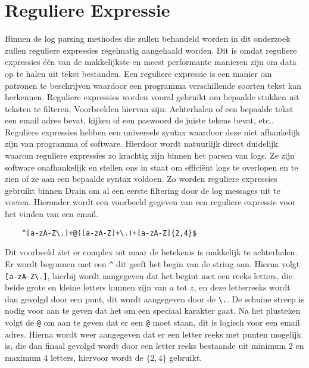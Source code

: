 \section{Reguliere Expressie}
Binnen de log parsing methodes die zullen behandeld worden in dit onderzoek zullen reguliere expressies regelmatig aangehaald worden. Dit is omdat reguliere expressies één van de makkelijkste en meest performante manieren zijn om data op te halen uit tekst bestanden. Een reguliere expressie is een manier om patronen te beschrijven waardoor een programma verschillende soorten tekst kan herkennen. Reguliere expressies worden vooral gebruikt om bepaalde stukken uit teksten te filteren. Voorbeelden hiervan zijn: Achterhalen of een bepaalde tekst een email adres bevat, kijken of een paswoord de juiste tekens bevat, etc.. Reguliere expressies hebben een universele syntax waardoor deze niet afhankelijk zijn van programma of software. Hierdoor wordt natuurlijk direct duidelijk waarom reguliere expressies zo krachtig zijn binnen het parsen van logs. Ze zijn software onafhankelijk en stellen ons in staat om efficiënt logs te overlopen en te zien of ze aan een bepaalde syntax voldoen. Zo worden reguliere expressies gebruikt binnen Drain om al een eerste filtering door de log messages uit te voeren. Hieronder wordt een voorbeeld gegeven van een reguliere expressie voor het vinden van een email.
\begin{verbatim}
    ^[a-zA-Z\.]+@([a-zA-Z]+\.)+[a-zA-Z]{2,4}$
\end{verbatim}

Dit voorbeeld ziet er complex uit maar de betekenis is makkelijk te achterhalen. Er wordt begonnen met een \verb!^! dit geeft het begin van de string aan. Hierna volgt \verb![a-zA-Z\.]!, hierbij wordt aangegeven dat het begint met een reeks letters, die beide grote en kleine letters kunnen zijn van \(a\) tot \(z\), en deze letterreeks wordt dan gevolgd door een punt, dit wordt aangegeven door de \verb!\.!. De schuine streep is nodig voor aan te geven dat het om een speciaal karakter gaat. Na het plusteken volgt de \verb!@! om aan te geven dat er een \verb!@! moet staan, dit is logisch voor een email adres. Hierna wordt weer aangegeven dat er een letter reeks met punten mogelijk is, die dan finaal gevolgd wordt door een letter reeks bestaande uit minimum 2 en maximum 4 letters, hiervoor wordt de \(\{2,4\}\) gebruikt.\\


